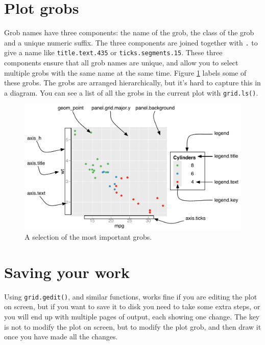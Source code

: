 \section{Plot grobs}\label{sec:plot-grobs}

Grob names have three components: the name of the grob, the class of the
grob and a unique numeric suffix. The three components are joined
together with \texttt{.} to give a name like \texttt{title.text.435} or
\texttt{ticks.segments.15}. These three components ensure that all grob
names are unique, and allow you to select multiple grobs with the same
name at the same time. Figure \ref{fig:grobs} labels some of these
grobs. The grobs are arranged hierarchically, but it's hard to capture
this in a diagram. You can see a list of all the grobs in the current
plot with \texttt{grid.ls()}. 

\begin{figure}[htbp]
  \centering
    \includegraphics[width=\linewidth]{diagrams/grid-grobs}
  \caption{A selection of the most important grobs.}
  \label{fig:grobs}
\end{figure}

\section{Saving your work}\label{sec:grid-save}

Using \texttt{grid.gedit()}, and similar functions, works fine if you
are editing the plot on screen, but if you want to save it to disk you
need to take some extra steps, or you will end up with multiple pages of
output, each showing one change. The key is not to modify the plot on
screen, but to modify the plot grob, and then draw it once you have made
all the changes. 

